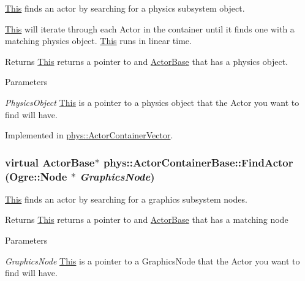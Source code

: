 \hyperlink{structThis}{This} finds an actor by searching for a physics subsystem object. 

\hyperlink{structThis}{This} will iterate through each Actor in the container until it finds one with a matching physics object. \hyperlink{structThis}{This} runs in linear time. \begin{DoxyReturn}{Returns}
\hyperlink{structThis}{This} returns a pointer to and \hyperlink{classphys_1_1ActorBase}{ActorBase} that has a physics object. 
\end{DoxyReturn}

\begin{DoxyParams}{Parameters}
\item[{\em PhysicsObject}]\hyperlink{structThis}{This} is a pointer to a physics object that the Actor you want to find will have. \end{DoxyParams}


Implemented in \hyperlink{classphys_1_1ActorContainerVector_a5ebcdeb3018f3baf92154ddec79cd054}{phys::ActorContainerVector}.

\hypertarget{classphys_1_1ActorContainerBase_a2e4652bf92f24a0ff20bdc4a7173b567}{
\subsubsection[{FindActor}]{\setlength{\rightskip}{0pt plus 5cm}virtual {\bf ActorBase}$\ast$ phys::ActorContainerBase::FindActor (Ogre::Node $\ast$ {\em GraphicsNode})}}
\label{d1/d00/classphys_1_1ActorContainerBase_a2e4652bf92f24a0ff20bdc4a7173b567}


\hyperlink{structThis}{This} finds an actor by searching for a graphics subsystem nodes. 

\begin{DoxyReturn}{Returns}
\hyperlink{structThis}{This} returns a pointer to and \hyperlink{classphys_1_1ActorBase}{ActorBase} that has a matching node 
\end{DoxyReturn}

\begin{DoxyParams}{Parameters}
\item[{\em GraphicsNode}]\hyperlink{structThis}{This} is a pointer to a GraphicsNode that the Actor you want to find will have. \end{DoxyParams}



